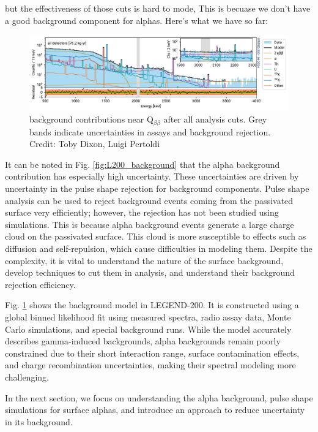  but the effectiveness of those cuts is hard to mode, This is becuase we don't have a good background component for alphas. Here's what we have so far:

\begin{figure}
\centering
  \includegraphics[width=0.99\linewidth]{ch2/figs/l200-bkgmodel-2_compressed.pdf}
  \caption{{\Ltwo} background contributions near Q$_{\beta\beta}$ after all analysis cuts. Grey bands indicate uncertainties in assays and background rejection. Credit: Toby Dixon, Luigi Pertoldi}
\label{ch2:fig:L200_background_model_fit}
  \end{figure}

  

 It can be noted in Fig. \ref{fig:L200_background} that the alpha background contribution has especially high uncertainty. These uncertainties are driven by uncertainty in the pulse shape rejection for background components. Pulse shape analysis can be used to reject background events coming from the passivated surface very efficiently; however, the rejection has not been studied using simulations. This is because alpha background events generate a large charge cloud on the passivated surface. This cloud is more susceptible to effects such as diffusion and self-repulsion, which cause difficulties in modeling them. Despite the complexity, it is vital to understand the nature of the surface background, develop techniques to cut them in analysis, and understand their background rejection efficiency. 
 
 
 
Fig. \ref{ch2:fig:L200_background_model_fit} shows the background model in LEGEND-200. It is constructed using a global binned likelihood fit using measured spectra, radio assay data, Monte Carlo simulations, and special background runs. While the model accurately describes gamma-induced backgrounds, alpha backgrounds remain poorly constrained due to their short interaction range, surface contamination effects, and charge recombination uncertainties, making their spectral modeling more challenging.


 In the next section, we focus on understanding the alpha background, pulse shape simulations for surface alphas, and introduce an approach to reduce uncertainty in its background.